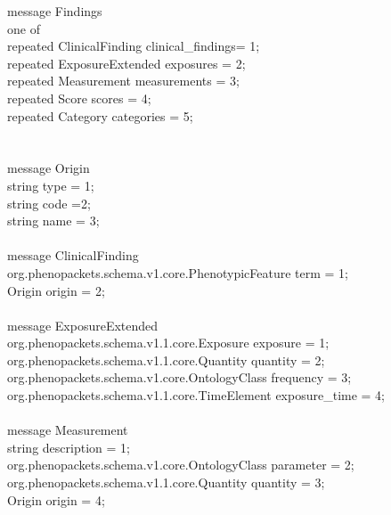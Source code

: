 \documentclass[a4paper, 10pt]{article}
\begin{document}
message \colorbox{yellow!80}{Findings} \ { \\
    one of \ { \\
        repeated \colorbox{yellow!80}{ClinicalFinding} clinical\_findings= 1; \\
        repeated \colorbox{yellow!80}{ExposureExtended} exposures = 2; \\
        repeated \colorbox{yellow!80}{Measurement} measurements = 3; \\
        repeated \colorbox{yellow!80}{Score} scores = 4; \\
        repeated \colorbox{yellow!80}{Category} categories = 5; \\
   \ } \\
\ } \\






message \colorbox{yellow!80}{Origin} \ { \\
    string type = 1; \\
    string code =2; \\
    string name = 3; \\
\ } \\





message \colorbox{yellow!80}{ClinicalFinding} \ { \\
    org.phenopackets.schema.v1.core.PhenotypicFeature term = 1; \\
    \colorbox{yellow!80}{Origin} origin = 2; \\
\ } \\




message \colorbox{yellow!80}{ExposureExtended} \ { \\
    org.phenopackets.schema.v1.1.core.Exposure exposure = 1; \\
    org.phenopackets.schema.v1.1.core.Quantity quantity = 2; \\
    org.phenopackets.schema.v1.core.OntologyClass frequency = 3; \\
    org.phenopackets.schema.v1.1.core.TimeElement exposure\_time = 4; \\
\ } \\





message \colorbox{yellow!80}{Measurement} \ {\\
    string description = 1; \\
    org.phenopackets.schema.v1.core.OntologyClass parameter = 2; \\
    org.phenopackets.schema.v1.1.core.Quantity quantity = 3; \\
    \colorbox{yellow!80}{Origin} origin = 4; \\
\ } \\
\end{document}
